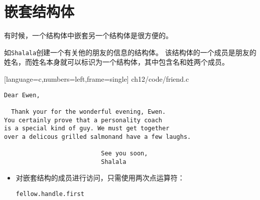 \section{嵌套结构体}
\begin{frame}[fragile]\ft{\secname}
有时候，一个结构体中嵌套另一个结构体是很方便的。\vspace{0.1in}

如\verb|Shalala|创建一个有关他的朋友的信息的结构体。
该结构体的一个成员是朋友的姓名，而姓名本身就可以标识为一个结构体，其中包含名和姓两个成员。
\end{frame}


\begin{frame}\ft{\secname}

[language=c,numbers=left,frame=single]
{ch12/code/friend.c}
\end{frame}


\begin{frame}[fragile]\ft{\secname}
    \begin{lstlisting}[backgroundcolor=\color{blue!20}]
Dear Ewen, 

  Thank your for the wonderful evening, Ewen.
You certainly prove that a personality coach
is a special kind of guy. We must get together
over a delicous grilled salmonand have a few laughs.

                           See you soon, 
                           Shalala
\end{lstlisting}
\end{frame}

\begin{frame}[fragile]\ft{\secname}
  \begin{itemize}
  \item 对嵌套结构的成员进行访问，只需使用两次点运算符：
    \begin{lstlisting}[basicstyle=\ttfamily]
fellow.handle.first      
    \end{lstlisting}
  \end{itemize}
\end{frame}
